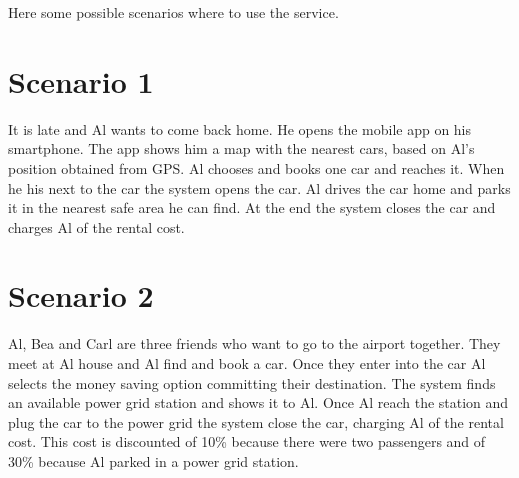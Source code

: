 Here some possible scenarios where to use the service.
\section{Scenario 1}
It is late and Al wants to come back home. He opens the mobile app on his smartphone. The app shows him a map with the nearest cars, based on Al's position obtained from GPS. Al chooses and books one car and reaches it. When he his next to the car the system opens the car.
Al drives the car home and parks it in the nearest safe area he can find. At the end the system closes the car and charges Al of the rental cost.
\section{Scenario 2}
Al, Bea and Carl are three friends who want to go to the airport together. They meet at Al house and Al find and book a car. Once they enter into the car Al selects the money saving option committing their destination. The system finds an available power grid station and shows it to Al. Once Al reach the station and plug the car to the power grid the system close the car, charging Al of the rental cost.
This cost is discounted of 10\% because there were two passengers and of 30\% because Al parked in a power grid station.
